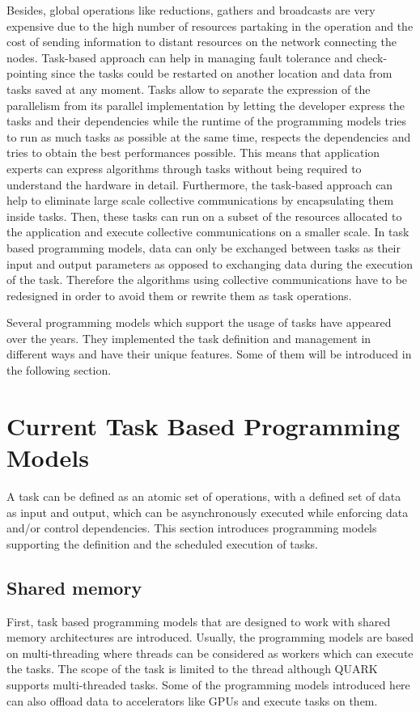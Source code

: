 Besides, global operations like reductions, gathers and broadcasts are very expensive due to the high number of resources partaking in the operation and the cost of sending information to distant resources on the network connecting the nodes.
Task-based approach can help in managing fault tolerance and check-pointing since the tasks could be restarted on another location and data from tasks saved at any moment.
Tasks allow to separate the expression of the parallelism from its parallel implementation by letting the developer express the tasks and their dependencies while the runtime of the programming models tries to run as much tasks as possible at the same time, respects the dependencies and tries to obtain the best performances possible.
This means that application experts can express algorithms through tasks without being required to understand the hardware in detail.
Furthermore, the task-based approach can help to eliminate large scale collective communications by encapsulating them inside tasks.
Then, these tasks can run on a subset of the resources allocated to the application and execute collective communications on a smaller scale.
In task based programming models, data can only be exchanged between tasks as their input and output parameters as opposed to exchanging data during the execution of the task.
Therefore the algorithms using collective communications have to be redesigned in order to avoid them or rewrite them as task operations.

Several programming models which support the usage of tasks have appeared over the years.
They implemented the task definition and management in different ways and have their unique features.
Some of them will be introduced in the following section.


\section{Current Task Based Programming Models}
A task can be defined as an atomic set of operations, with a defined set of data as input and output, which can be asynchronously executed while enforcing data and/or control dependencies.
This section introduces programming models supporting the definition and the scheduled execution of tasks.

\subsection{Shared memory}
First, task based programming models that are designed to work with shared memory architectures are introduced.
Usually, the programming models are based on multi-threading where threads can be considered as workers which can execute the tasks.
The scope of the task is limited to the thread although QUARK supports multi-threaded tasks.
Some of the programming models introduced here can also offload data to accelerators like GPUs and execute tasks on them.

